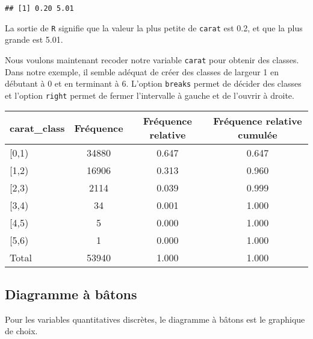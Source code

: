 \documentclass[]{book}
\newenvironment{Shaded}{\begin{snugshade}}{\end{snugshade}}
\newcommand{\KeywordTok}[1]{\textcolor[rgb]{0.13,0.29,0.53}{\textbf{#1}}}
\newcommand{\DataTypeTok}[1]{\textcolor[rgb]{0.13,0.29,0.53}{#1}}
\newcommand{\DecValTok}[1]{\textcolor[rgb]{0.00,0.00,0.81}{#1}}
\newcommand{\StringTok}[1]{\textcolor[rgb]{0.31,0.60,0.02}{#1}}
\newcommand{\OtherTok}[1]{\textcolor[rgb]{0.56,0.35,0.01}{#1}}
\newcommand{\OperatorTok}[1]{\textcolor[rgb]{0.81,0.36,0.00}{\textbf{#1}}}
\newcommand{\NormalTok}[1]{#1}
\begin{document}
\begin{verbatim}
## [1] 0.20 5.01
\end{verbatim}

La sortie de \texttt{R} signifie que la valeur la plus petite de
\texttt{carat} est 0.2, et que la plus grande est 5.01.

Nous voulons maintenant recoder notre variable \texttt{carat} pour
obtenir des classes. Dans notre exemple, il semble adéquat de créer des
classes de largeur 1 en débutant à 0 et en terminant à 6. L'option
\texttt{breaks} permet de décider des classes et l'option \texttt{right}
permet de fermer l'intervalle à gauche et de l'ouvrir à droite.

\begin{Shaded}
\end{Shaded}

\begin{tabular}{l|c|c|c}
\hline
carat\_class & Fréquence & Fréquence relative & Fréquence relative cumulée\\
\hline
[0,1) & 34880 & 0.647 & 0.647\\
\hline
[1,2) & 16906 & 0.313 & 0.960\\
\hline
[2,3) & 2114 & 0.039 & 0.999\\
\hline
[3,4) & 34 & 0.001 & 1.000\\
\hline
[4,5) & 5 & 0.000 & 1.000\\
\hline
[5,6) & 1 & 0.000 & 1.000\\
\hline
Total & 53940 & 1.000 & 1.000\\
\hline
\end{tabular}

\subsection{Diagramme à bâtons}\label{diagramme-a-batons}

Pour les variables quantitatives discrètes, le diagramme à bâtons est le
graphique de choix.
\end{document}
